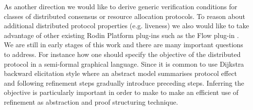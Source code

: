 \documentclass{llncs}
\begin{document}
As another direction we would like to derive generic verification conditions for classes of distributed consensus or resource allocation protocols. To reason about additional distributed protocol properties (e.g. liveness) we also would like to take advantage of other existing Rodin Platform plug-ins such as the Flow plug-in \cite{flow}. We are still in early stages of this work and there are many important questions to address. For instance how one should specify the objective of the distributed protocol in a semi-formal graphical language. Since it is common to use Dijkstra backward elicitation style where an abstract model summarises protocol effect and following refinement steps gradually introduce preceding steps. Inferring the objective is particularly important in order to make to make an efficient use of refinement as abstraction and proof structuring technique. 
	

	


	
	
	
\end{document}
